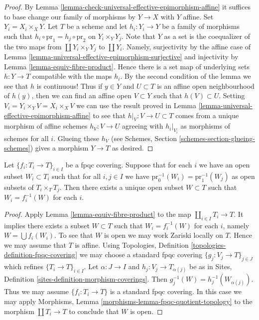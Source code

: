 \begin{proof}
By Lemma \ref{lemma-check-universal-effective-epimorphism-affine}
it suffices to base change our family of morphisms
by $Y \to X$ with $Y$ affine. Set $Y_i = X_i \times_X Y$.
Let $T$ be a scheme and let $h_i : Y_i \to Y$ be a family of morphisms
such that $h_i \circ \text{pr}_1 = h_j \circ \text{pr}_2$
on $Y_i \times_Y Y_j$. Note that $Y$ as a set is the coequalizer
of the two maps from $\coprod Y_i \times_Y Y_j$ to $\coprod Y_i$.
Namely, surjectivity by the affine case of
Lemma \ref{lemma-universal-effective-epimorphism-surjective}
and injectivity by Lemma \ref{lemma-equiv-fibre-product}.
Hence there is a set map of underlying sets $h : Y \to T$
compatible with the maps $h_i$. By the second condition of
the lemma we see that $h$ is continuous!
Thus if $y \in Y$ and $U \subset T$ is an affine open
neighbourhood of $h(y)$, then we can find an affine open
$V \subset Y$ such that $h(V) \subset U$.
Setting $V_i = Y_i \times_Y V = X_i \times_X V$
we can use the result proved in
Lemma \ref{lemma-universal-effective-epimorphism-affine}
to see that $h|_V : V \to U \subset T$ comes from a unique
morphism of affine schemes $h_V : V \to U$ agreeing with $h_i|_{V_i}$
as morphisms of schemes for all $i$. Glueing these $h_V$
(see Schemes, Section \ref{schemes-section-glueing-schemes})
gives a morphism $Y \to T$ as desired.
\end{proof}

\begin{lemma}
\label{lemma-open-fpqc-covering}
Let $\{f_i : T_i \to T\}_{i \in I}$ be a fpqc covering.
Suppose that for each $i$ we have an open subset $W_i \subset T_i$
such that for all $i, j \in I$ we have
$\text{pr}_0^{-1}(W_i) = \text{pr}_1^{-1}(W_j)$ as open
subsets of $T_i \times_T T_j$. Then there exists a unique open subset
$W \subset T$ such that $W_i = f_i^{-1}(W)$ for each $i$.
\end{lemma}

\begin{proof}
Apply
Lemma \ref{lemma-equiv-fibre-product}
to the map $\coprod_{i \in I} T_i \to T$.
It implies there exists a subset $W \subset T$ such that
$W_i = f_i^{-1}(W)$ for each $i$, namely $W = \bigcup f_i(W_i)$.
To see that $W$ is open we may work Zariski locally on $T$.
Hence we may assume that $T$ is affine. Using Topologies, Definition
\ref{topologies-definition-fpqc-covering} we may choose
a standard fpqc covering $\{g_j : V_j \to T\}_{j \in J}$ which refines
$\{T_i \to T\}_{i \in I}$. Let $\alpha : J \to I$ and
$h_j : V_j \to T_{\alpha(j)}$ be as in
Sites, Definition \ref{sites-definition-morphism-coverings}.
Then $g_j^{-1}(W) = h_j^{-1}(W_{\alpha(j)})$.
Thus we may assume $\{f_i : T_i \to T\}$ is a standard fpqc covering.
In this case we may apply
Morphisms, Lemma \ref{morphisms-lemma-fpqc-quotient-topology}
to the morphism $\coprod T_i \to T$ to conclude that $W$ is open.
\end{proof}

